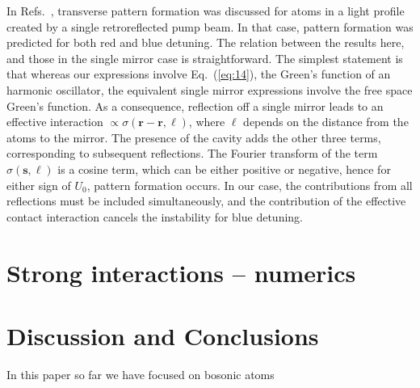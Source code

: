 \documentclass[pra,twocolumn,superscriptaddress]{revtex4-1}
\newcommand{\vect}[1]{\mathbf{#1}}
\begin{document}
In Refs.~\cite{Tesio2012,Labeyrie2014,Robb2015}, transverse pattern
formation was discussed for atoms in a light profile created by a
single retroreflected pump beam.  In that case, pattern formation was
predicted for both red and blue detuning.  The relation between the
results here, and those in the single mirror case is straightforward.
The simplest statement is that whereas our expressions involve
Eq.~(\ref{eq:14}), the Green's function of an harmonic oscillator, the
equivalent single mirror expressions involve the free space Green's
function.  As a consequence, reflection off a single mirror leads to
an effective interaction $\propto \sigma(\vect r-\vect r, \ell)$,
where $\ell$ depends on the distance from the atoms to the mirror.
The presence of the cavity adds the other three terms, corresponding
to subsequent reflections.  The Fourier transform of the term
$\sigma(\vect s,\ell)$ is a cosine term, which can be either positive
or negative, hence for either sign of $U_0$, pattern formation occurs.
In our case, the contributions from all reflections must be included
simultaneously, and the contribution of the effective contact
interaction cancels the instability for blue detuning.

\section{Strong interactions -- numerics}
\label{sec:strong-interactions}






\section{Discussion and Conclusions}
\label{sec:conclusions}

In this paper so far we have focused on bosonic atoms




\appendix
\end{document}
